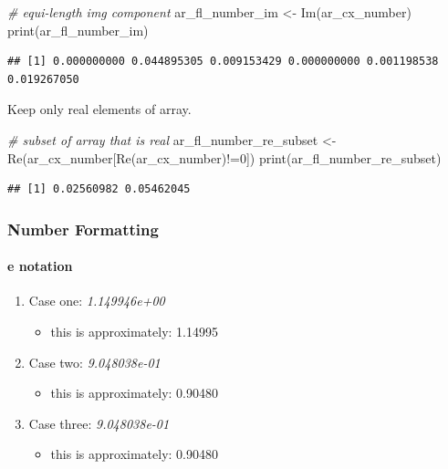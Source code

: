\documentclass[
]{book}
\newenvironment{Shaded}{\begin{snugshade}}{\end{snugshade}}
\newcommand{\CommentTok}[1]{\textcolor[rgb]{0.56,0.35,0.01}{\textit{#1}}}
\newcommand{\DecValTok}[1]{\textcolor[rgb]{0.00,0.00,0.81}{#1}}
\newcommand{\FunctionTok}[1]{\textcolor[rgb]{0.00,0.00,0.00}{#1}}
\newcommand{\NormalTok}[1]{#1}
\newcommand{\OtherTok}[1]{\textcolor[rgb]{0.56,0.35,0.01}{#1}}
\newcommand{\SpecialCharTok}[1]{\textcolor[rgb]{0.00,0.00,0.00}{#1}}
\providecommand{\tightlist}{%
  \setlength{\itemsep}{0pt}\setlength{\parskip}{0pt}}
\begin{document}
\begin{Shaded}
\begin{Highlighting}[]
\CommentTok{\# equi{-}length img component}
\NormalTok{ar\_fl\_number\_im }\OtherTok{\textless{}{-}} \FunctionTok{Im}\NormalTok{(ar\_cx\_number)}
\FunctionTok{print}\NormalTok{(ar\_fl\_number\_im)}
\end{Highlighting}
\end{Shaded}

\begin{verbatim}
## [1] 0.000000000 0.044895305 0.009153429 0.000000000 0.001198538 0.019267050
\end{verbatim}

Keep only real elements of array.

\begin{Shaded}
\begin{Highlighting}[]
\CommentTok{\# subset of array that is real}
\NormalTok{ar\_fl\_number\_re\_subset }\OtherTok{\textless{}{-}} \FunctionTok{Re}\NormalTok{(ar\_cx\_number[}\FunctionTok{Re}\NormalTok{(ar\_cx\_number)}\SpecialCharTok{!=}\DecValTok{0}\NormalTok{])}
\FunctionTok{print}\NormalTok{(ar\_fl\_number\_re\_subset)}
\end{Highlighting}
\end{Shaded}

\begin{verbatim}
## [1] 0.02560982 0.05462045
\end{verbatim}

\hypertarget{number-formatting}{%
\subsubsection{Number Formatting}\label{number-formatting}}

\hypertarget{e-notation}{%
\paragraph{e notation}\label{e-notation}}

\begin{enumerate}
\def\labelenumi{\arabic{enumi}.}
\tightlist
\item
  Case one: \emph{1.149946e+00}

  \begin{itemize}
  \tightlist
  \item
    this is approximately: 1.14995
  \end{itemize}
\item
  Case two: \emph{9.048038e-01}

  \begin{itemize}
  \tightlist
  \item
    this is approximately: 0.90480
  \end{itemize}
\item
  Case three: \emph{9.048038e-01}

  \begin{itemize}
  \tightlist
  \item
    this is approximately: 0.90480
  \end{itemize}
\end{enumerate}
\end{document}
